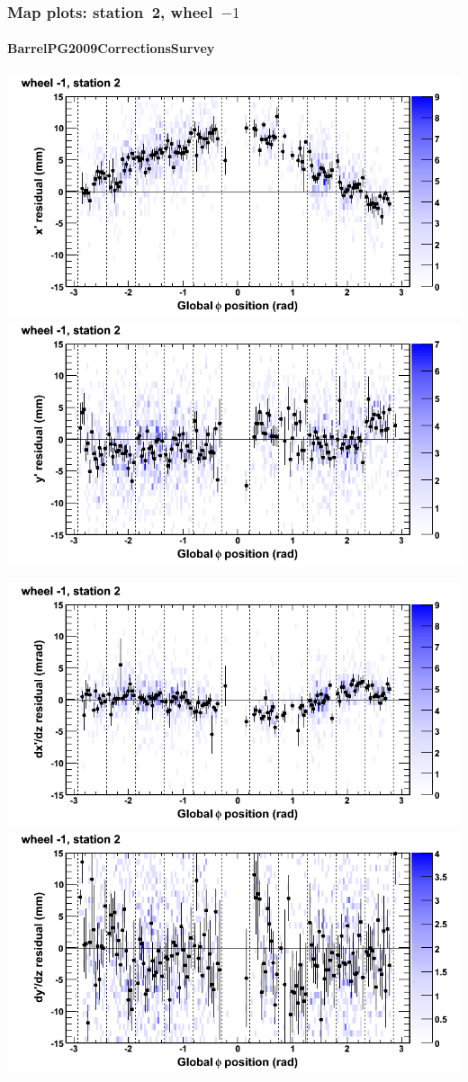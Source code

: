 \documentclass[compress]{beamer}
\begin{document}
\begin{frame}
\frametitle{Map plots: station~2, wheel~$-1$}
\framesubtitle{BarrelPG2009CorrectionsSurvey}
\includegraphics[width=0.5\linewidth]{mapplots_01/DTvsphi_st2whB_x.png}
\includegraphics[width=0.5\linewidth]{mapplots_01/DTvsphi_st2whB_y.png}

\includegraphics[width=0.5\linewidth]{mapplots_01/DTvsphi_st2whB_dxdz.png}
\includegraphics[width=0.5\linewidth]{mapplots_01/DTvsphi_st2whB_dydz.png}
\end{frame}
\end{document}
